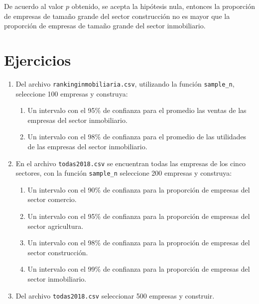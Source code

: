 \documentclass[letterpaper,]{book}
\providecommand{\tightlist}{%
  \setlength{\itemsep}{0pt}\setlength{\parskip}{0pt}}
\begin{document}
De acuerdo al valor \(p\) obtenido, se acepta la hipótesis nula, entonces la proporción de empresas de tamaño grande del sector construcción no es mayor que la proporción de empresas de tamaño grande del sector inmobiliario.

\newpage

\hypertarget{ejercicios-1}{%
\section{Ejercicios}\label{ejercicios-1}}

\begin{enumerate}
\def\labelenumi{\arabic{enumi}.}
\item
  Del archivo \texttt{rankinginmobiliaria.csv}, utilizando la función \texttt{sample\_n}, seleccione 100 empresas y construya:

  \begin{enumerate}
  \def\labelenumii{\alph{enumii}.}
  \tightlist
  \item
    Un intervalo con el 95\% de confianza para el promedio las ventas de las empresas del sector inmobiliario.
  \item
    Un intervalo con el 98\% de confianza para el promedio de las utilidades de las empresas del sector inmobiliario.
  \end{enumerate}
\item
  En el archivo \texttt{todas2018.csv} se encuentran todas las empresas de los cinco sectores, con la función \texttt{sample\_n} seleccione 200 empresas y construya:

  \begin{enumerate}
  \def\labelenumii{\alph{enumii}.}
  \tightlist
  \item
    Un intervalo con el 90\% de confianza para la proporción de empresas del sector comercio.
  \item
    Un intervalo con el 95\% de confianza para la proporción de empresas del sector agricultura.
  \item
    Un intervalo con el 98\% de confianza para la proproción de empresas del sector construcción.
  \item
    Un intervalo con el 99\% de confianza para la proporción de empresas del sector inmobiliario.
  \end{enumerate}
\item
  Del archivo \texttt{todas2018.csv} seleccionar 500 empresas y construir.


\end{enumerate}
\end{document}
